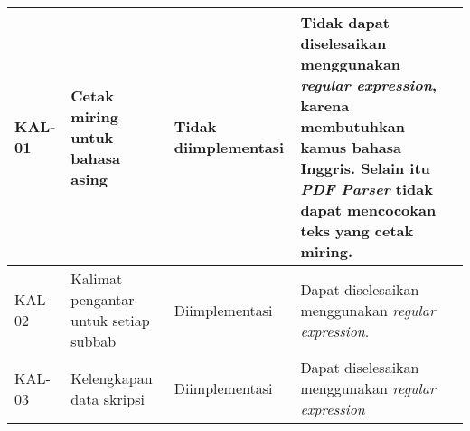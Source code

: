 \begin{table}[H]
\begin{center}
\begin{tabular}{|p{1.5 cm}|>{\raggedright} p{4 cm}| p{2.5 cm}| p{6.5 cm}|}
		\hline 
		KAL-01 & Cetak miring untuk bahasa asing & Tidak \newline diimplementasi & Tidak dapat diselesaikan menggunakan \textit{regular expression}, karena membutuhkan kamus bahasa Inggris. Selain itu \textit{PDF Parser} tidak dapat mencocokan teks yang cetak miring. \newline \\ 
		\hline 
		KAL-02 & Kalimat pengantar untuk setiap subbab & Diimplementasi & Dapat diselesaikan menggunakan \textit{regular expression}. \newline \\ 
		\hline 
		KAL-03 & Kelengkapan data skripsi & Diimplementasi & Dapat diselesaikan menggunakan \textit{regular expression} \newline \\ 
		\hline  
		\end{tabular}
	\end{center}
\end{table}


